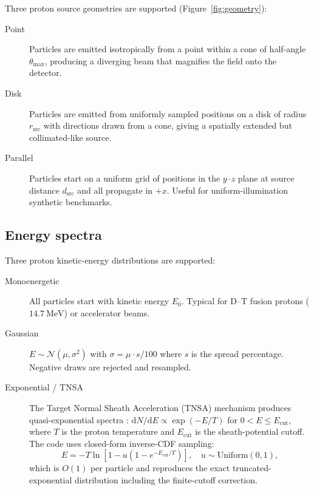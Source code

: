 \documentclass[review,12pt]{elsarticle}
\begin{document}
Three proton source geometries are supported (Figure~\ref{fig:geometry}):

\begin{description}
  \item[Point] Particles are emitted isotropically from a point within a cone of
    half-angle $\theta_\mathrm{max}$, producing a diverging beam that magnifies
    the field onto the detector.
  \item[Disk] Particles are emitted from uniformly sampled positions on a disk of
    radius $r_\mathrm{src}$ with directions drawn from a cone, giving a spatially
    extended but collimated-like source.
  \item[Parallel] Particles start on a uniform grid of positions in the $y$--$z$ plane
    at source distance $d_\mathrm{src}$ and all propagate in $+x$. Useful for
    uniform-illumination synthetic benchmarks.
\end{description}

\subsection{Energy spectra}

Three proton kinetic-energy distributions are supported:

\begin{description}
  \item[Monoenergetic] All particles start with kinetic energy $E_0$. Typical for
    D--T fusion protons ($\SI{14.7}{\MeV}$) or accelerator beams.
  \item[Gaussian] $E \sim \mathcal{N}(\mu, \sigma^2)$ with $\sigma = \mu \cdot s / 100$
    where $s$ is the spread percentage. Negative draws are rejected and resampled.
  \item[Exponential / TNSA] The Target Normal Sheath Acceleration (TNSA) mechanism
    produces quasi-exponential spectra \cite{wilks2001}: $\mathrm{d}N/\mathrm{d}E \propto \exp(-E/T)$
    for $0 < E \leq E_\mathrm{cut}$, where $T$ is the proton temperature and
    $E_\mathrm{cut}$ is the sheath-potential cutoff. The code uses closed-form
    inverse-CDF sampling:
    \begin{equation}
      E = -T \ln\!\left[1 - u\!\left(1 - e^{-E_\mathrm{cut}/T}\right)\right], \quad u \sim \mathrm{Uniform}(0,1),
      \label{eq:tnsa_icdf}
    \end{equation}
    which is $O(1)$ per particle and reproduces the exact truncated-exponential
    distribution including the finite-cutoff correction.
\end{description}
\end{document}
